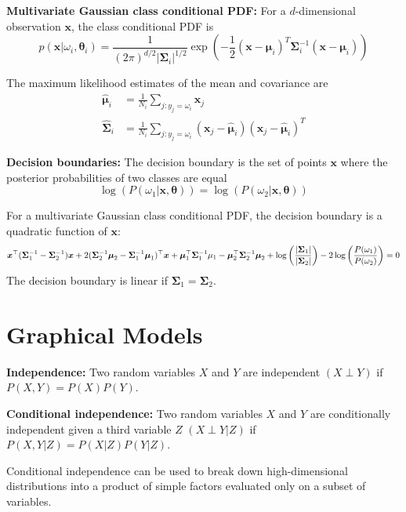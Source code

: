 \documentclass[12pt]{article}
\begin{document}
\textbf{Multivariate Gaussian class conditional PDF:} For a $d$-dimensional observation $\boldsymbol{x}$, the class conditional PDF is
$$p(\boldsymbol{x} | \omega_i, \boldsymbol{\theta}_i) = \frac{1}{(2\pi)^{d/2} |\boldsymbol{\Sigma}_i|^{1/2}} \exp\left(-\frac{1}{2}(\boldsymbol{x} - \boldsymbol{\mu}_i)^T \boldsymbol{\Sigma}_i^{-1} (\boldsymbol{x} - \boldsymbol{\mu}_i)\right)$$

The maximum likelihood estimates of the mean and covariance are
\begin{align*}
\hat{\boldsymbol{\mu}}_i &= \frac{1}{N_i} \sum_{j:y_j = \omega_i} \boldsymbol{x}_j \\
\hat{\boldsymbol{\Sigma}}_i &= \frac{1}{N_i} \sum_{j:y_j = \omega_i} (\boldsymbol{x}_j - \hat{\boldsymbol{\mu}}_i)(\boldsymbol{x}_j - \hat{\boldsymbol{\mu}}_i)^T
\end{align*}

\textbf{Decision boundaries:} The decision boundary is the set of points $\boldsymbol{x}$ where the posterior probabilities of two classes are equal
$$
\log(P(\omega_1 | \boldsymbol{x}, \boldsymbol{\theta})) = \log(P(\omega_2 | \boldsymbol{x}, \boldsymbol{\theta}))
$$

For a multivariate Gaussian class conditional PDF, the decision boundary is a quadratic function of $\boldsymbol{x}$:
$$\boldsymbol{x}^\top (\boldsymbol{\Sigma}_1^{-1} - \boldsymbol{\Sigma}_2^{-1}) \boldsymbol{x} + 2(\boldsymbol{\Sigma}_2^{-1} \boldsymbol{\mu}_2 - \boldsymbol{\Sigma}_1^{-1} \boldsymbol{\mu}_1)^\top \boldsymbol{x} + \boldsymbol{\mu}_1^\top \boldsymbol{\Sigma}_1^{-1} \bold{\mu}_1 - \boldsymbol{\mu}_2^\top \boldsymbol{\Sigma}_2^{-1} \boldsymbol{\mu}_2 + \log\left(\frac{|\boldsymbol{\Sigma}_1|}{|\boldsymbol{\Sigma}_2|}\right) - 2 \log \left(\frac{P(\omega_1)}{P(\omega_2)}\right)= 0$$
The decision boundary is linear if $\boldsymbol{\Sigma}_1 = \boldsymbol{\Sigma}_2$.

\section{Graphical Models}
\textbf{Independence:} Two random variables $X$ and $Y$ are independent $(X \perp Y)$ if $P(X, Y) = P(X)P(Y)$.

\textbf{Conditional independence:} Two random variables $X$ and $Y$ are conditionally independent given a third variable $Z$ $(X \perp Y | Z)$ if $P(X, Y | Z) = P(X | Z) P(Y | Z)$.

Conditional independence can be used to break down high-dimensional distributions into a product of simple factors evaluated only on a subset of variables.
\end{document}
